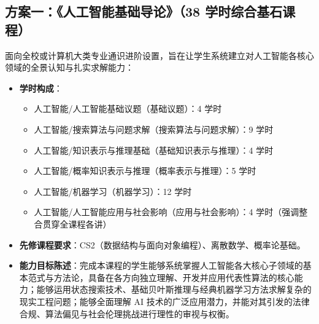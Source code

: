 \subsection{方案一：《人工智能基础导论》（38 学时综合基石课程）}
面向全校或计算机大类专业通识进阶设置，旨在让学生系统建立对人工智能各核心领域的全景认知与扎实求解能力：
\begin{itemize}
    \item \textbf{学时构成}：
    \begin{itemize}
        \item 人工智能/人工智能基础议题（基础议题）：4 学时
        \item 人工智能/搜索算法与问题求解（搜索算法与问题求解）：9 学时
        \item 人工智能/知识表示与推理基础（基础知识表示与推理）：4 学时
        \item 人工智能/概率知识表示与推理（概率表示与推理）：5 学时
        \item 人工智能/机器学习（机器学习）：12 学时
        \item 人工智能/人工智能应用与社会影响（应用与社会影响）：4 学时（强调整合贯穿全课程各讲）
    \end{itemize}
    \item \textbf{先修课程要求}：CS2（数据结构与面向对象编程）、离散数学、概率论基础。
    \item \textbf{能力目标陈述}：完成本课程的学生能够系统掌握人工智能各大核心子领域的基本范式与方法论，具备在各方向独立理解、开发并应用代表性算法的核心能力；能够运用状态搜索技术、基础贝叶斯推理与经典机器学习方法求解复杂的现实工程问题；能够全面理解 AI 技术的广泛应用潜力，并能对其引发的法律合规、算法偏见与社会伦理挑战进行理性的审视与权衡。
\end{itemize}

